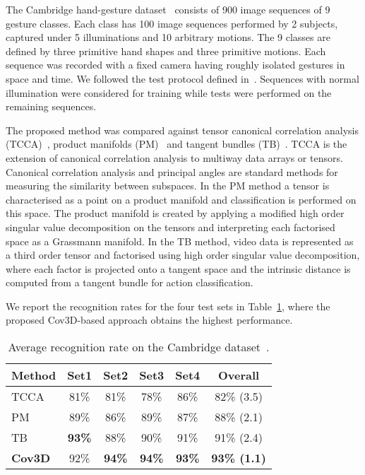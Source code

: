 \documentclass[10pt,twocolumn,letterpaper]{article}
\newcommand{\cov}{{Cov3D}}
\begin{document}
The Cambridge hand-gesture dataset~\cite{KimAndCipolla2009} consists of 900 image sequences of 9 gesture classes.
Each class has 100 image sequences performed by 2 subjects,
captured under 5 illuminations and 10 arbitrary motions.
The 9 classes are defined by three  primitive hand shapes and three primitive motions.
Each sequence was recorded with a fixed camera having roughly isolated gestures in space and time.
We followed the test protocol defined in~\cite{KimAndCipolla2009}.
Sequences with normal illumination were considered for training while tests were performed on the remaining sequences.

The proposed method was compared against tensor canonical correlation analysis (TCCA)~\cite{KimAndCipolla2009}, product manifolds
(PM)~\cite{LuiEtAl2010} and tangent bundles (TB)~\cite{Lui2010}. TCCA is the extension of canonical correlation analysis to multiway data arrays or
tensors. Canonical correlation analysis and principal angles are standard methods for measuring the similarity between subspaces.
In the PM method a tensor is characterised as a point on a product manifold and  classification is performed on this space. The product manifold is
created by applying a modified high order singular value decomposition on the tensors and interpreting each factorised space as a Grassmann manifold.
In the TB method, video data is represented as a third order tensor and factorised using high order singular value decomposition, where each factor is
projected onto a tangent space and the intrinsic distance is computed from a tangent bundle for action classification.

We report the recognition rates for the four test sets in Table~\ref{tab:hands_rates},
where the proposed \cov-based approach obtains the highest performance.

\begin{table}[!tb]
  \centering
  \footnotesize
  \begin{tabular}{lccccc}
    \toprule
    \bf{Method}                   &\bf{Set1} &\bf{Set2} &\bf{Set3} &\bf{Set4} &\bf{Overall}\\
    \midrule[\heavyrulewidth]
    TCCA~\cite{KimAndCipolla2009} &81\%      &81\%      &78\%      &86\%      &82\% (3.5)\\
    PM~\cite{LuiEtAl2010}         &89\%      &86\%      &89\%      &87\%      &88\% (2.1)\\
    TB~\cite{Lui2010}             &\bf{93\%} &88\%      &90\%      &91\%      &91\% (2.4)\\
    \bf{\cov}                     &92\%      &\bf{94\%} &\bf{94\%} &\bf{93\%} &\bf{93\% (1.1)}\\
    \bottomrule
  \end{tabular}
  
  ~
  
  \caption
    {
    \small
    Average recognition rate on the Cambridge dataset~\cite{KimAndCipolla2009}.
    }
  \label{tab:hands_rates}
\end{table}
\end{document}

